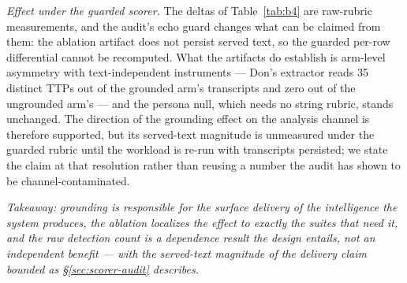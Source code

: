 \emph{Effect under the guarded scorer.} The deltas of
Table~\ref{tab:b4} are raw-rubric measurements, and the audit's echo
guard changes what can be claimed from them: the ablation artifact does
not persist served text, so the guarded per-row differential cannot be
recomputed. What the artifacts do establish is arm-level asymmetry with
text-independent instruments --- Don's extractor reads 35 distinct TTPs
out of the grounded arm's transcripts and zero out of the ungrounded
arm's --- and the persona null, which needs no string rubric, stands
unchanged. The direction of the grounding effect on the analysis
channel is therefore supported, but its served-text magnitude is
unmeasured under the guarded rubric until the workload is re-run with
transcripts persisted; we state the claim at that resolution rather
than reusing a number the audit has shown to be channel-contaminated.

\emph{Takeaway: grounding is responsible for the surface delivery of the
intelligence the system produces, the ablation localizes the effect to
exactly the suites that need it, and the raw detection count is a
dependence result the design entails, not an independent benefit ---
with the served-text magnitude of the delivery claim bounded as
\S\ref{sec:scorer-audit} describes.}


